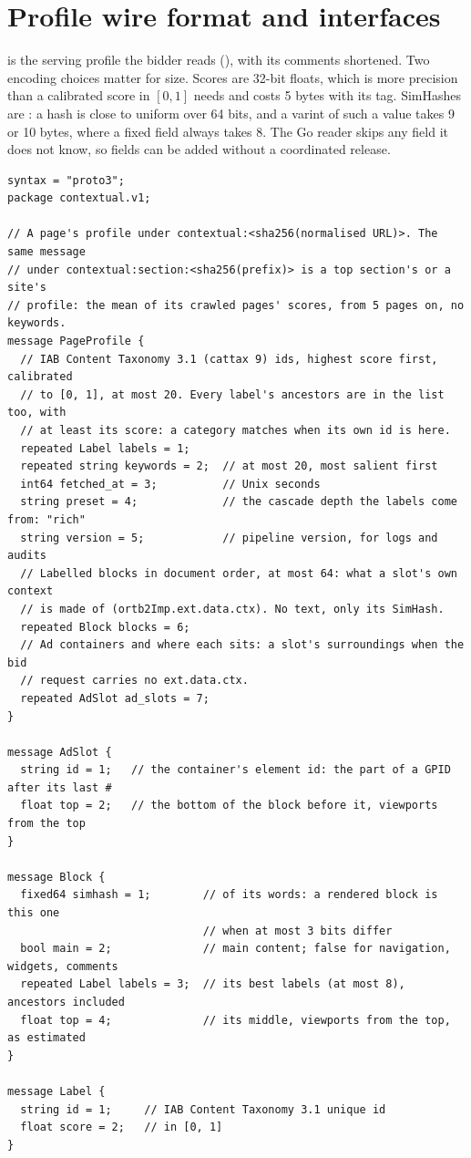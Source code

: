 \section{Profile wire format and interfaces}\label{app:wire}

 is the serving profile the bidder reads
(), with its comments shortened.
Two encoding choices matter for size. Scores are 32-bit floats, which is more
precision than a calibrated score in $[0, 1]$ needs and costs 5 bytes with its
tag. SimHashes are : a hash is close to uniform over 64 bits, and a
varint of such a value takes 9 or 10 bytes, where a fixed field always takes
8. The Go reader skips any field it does not know, so fields can be added
without a coordinated release.

\begin{lstlisting}[caption={The serving profile, \code{contextual.v1.PageProfile}.},label={lst:wire-proto},captionpos=b,columns=fixed,basewidth=0.5em,keepspaces=true]
syntax = "proto3";
package contextual.v1;

// A page's profile under contextual:<sha256(normalised URL)>. The same message
// under contextual:section:<sha256(prefix)> is a top section's or a site's
// profile: the mean of its crawled pages' scores, from 5 pages on, no keywords.
message PageProfile {
  // IAB Content Taxonomy 3.1 (cattax 9) ids, highest score first, calibrated
  // to [0, 1], at most 20. Every label's ancestors are in the list too, with
  // at least its score: a category matches when its own id is here.
  repeated Label labels = 1;
  repeated string keywords = 2;  // at most 20, most salient first
  int64 fetched_at = 3;          // Unix seconds
  string preset = 4;             // the cascade depth the labels come from: "rich"
  string version = 5;            // pipeline version, for logs and audits
  // Labelled blocks in document order, at most 64: what a slot's own context
  // is made of (ortb2Imp.ext.data.ctx). No text, only its SimHash.
  repeated Block blocks = 6;
  // Ad containers and where each sits: a slot's surroundings when the bid
  // request carries no ext.data.ctx.
  repeated AdSlot ad_slots = 7;
}

message AdSlot {
  string id = 1;   // the container's element id: the part of a GPID after its last #
  float top = 2;   // the bottom of the block before it, viewports from the top
}

message Block {
  fixed64 simhash = 1;        // of its words: a rendered block is this one
                              // when at most 3 bits differ
  bool main = 2;              // main content; false for navigation, widgets, comments
  repeated Label labels = 3;  // its best labels (at most 8), ancestors included
  float top = 4;              // its middle, viewports from the top, as estimated
}

message Label {
  string id = 1;     // IAB Content Taxonomy 3.1 unique id
  float score = 2;   // in [0, 1]
}
\end{lstlisting}

